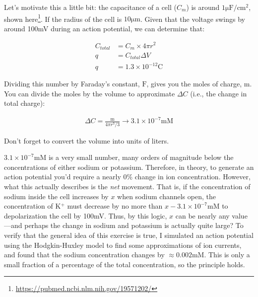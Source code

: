 Let's motivate this a little bit: the capacitance of a cell ($C_m$) is around $1\mathrm{\mu F}/\mathrm{cm}^2$, shown here\footnote{\url{https://pubmed.ncbi.nlm.nih.gov/19571202/}}. If the radius of the cell is $10\mathrm{\mu m}$. Given that the voltage swings by around 100mV during an action potential, we can determine that:


\begin{equation} \label{smallchange1}
\begin{split}
C_{total} &= C_m \times 4\pi r^2\\
q &= C_{total}\Delta V \\
q &= 1.3 \times 10^{-12}\mathrm{C}
\end{split}
\end{equation}

\bigskip

Dividing this number by Faraday's constant, $\mathrm{F}$, gives you the moles of charge, $\mathrm{m}$. You can divide the moles by the volume to approximate $\Delta C$ (i.e., the change in total charge):

\begin{equation} \label{eq8}
\begin{split}
\Delta C = \frac{\mathrm{m}}{4\pi r^3 /3} \rightarrow 3.1 \times 10^{-7} \mathrm{mM}
\end{split}
\end{equation}

Don't forget to convert the volume into units of liters.\newline

$3.1 \times 10^{-7} \mathrm{mM}$ is a very small number, many orders of magnitude below the concentrations of either sodium or potassium. Therefore, in theory, to generate an action potential you'd require a nearly 0\% change in ion concentration. However, what this actually describes is the \textit{net} movement. That is, if the concentration of sodium inside the cell increases by $x$ when sodium channels open, the concentration of K$^+$ must decrease by no more than $x - 3.1 \times 10^{-7} \mathrm{mM}$ to depolarization the cell by 100mV. Thus, by this logic, $x$ can be nearly any value---and perhaps the change in sodium and potassium is actually quite large? To verify that the general idea of this exercise is true, I simulated an action potential using the Hodgkin-Huxley model to find some approximations of ion currents, and found that the sodium concentration changes by $\approx 0.002$mM. This is only a small fraction of a percentage of the total concentration, so the principle holds. 





